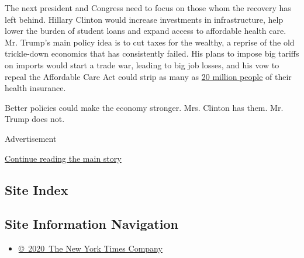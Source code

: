 The next president and Congress need to focus on those whom the recovery
has left behind. Hillary Clinton would increase investments in
infrastructure, help lower the burden of student loans and expand access
to affordable health care. Mr. Trump's main policy idea is to cut taxes
for the wealthy, a reprise of the old trickle-down economics that has
consistently failed. His plans to impose big tariffs on imports would
start a trade war, leading to big job losses, and his vow to repeal the
Affordable Care Act could strip as many as
\href{http://www.hhs.gov/about/news/2016/03/03/20-million-people-have-gained-health-insurance-coverage-because-affordable-care-act-new-estimates}{20
million people} of their health insurance.

Better policies could make the economy stronger. Mrs. Clinton has them.
Mr. Trump does not.

Advertisement

\protect\hyperlink{after-bottom}{Continue reading the main story}

\hypertarget{site-index}{%
\subsection{Site Index}\label{site-index}}

\hypertarget{site-information-navigation}{%
\subsection{Site Information
Navigation}\label{site-information-navigation}}

\begin{itemize}
\tightlist
\item
  \href{https://help.nytimes.com/hc/en-us/articles/115014792127-Copyright-notice}{©~2020~The
  New York Times Company}
\end{itemize}

